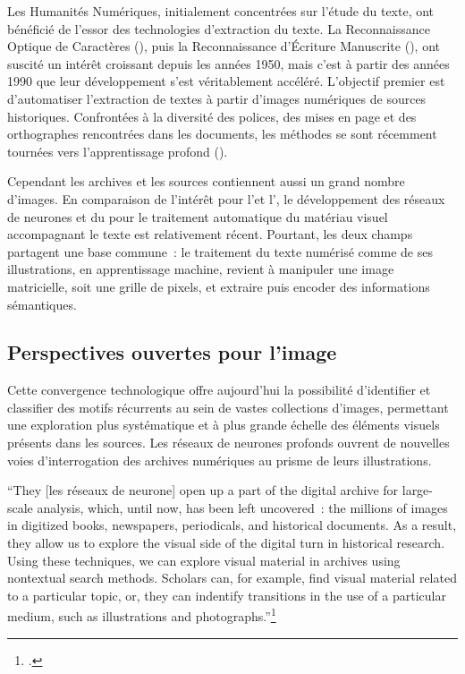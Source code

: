 Les Humanités Numériques, initialement concentrées sur l'étude du texte, ont bénéficié de l'essor des technologies d'extraction du texte. La Reconnaissance Optique de Caractères (\ocr), puis la Reconnaissance d'Écriture Manuscrite (\htr), ont suscité un intérêt croissant depuis les années 1950, mais c'est à partir des années 1990 que leur développement s'est véritablement accéléré. L'objectif premier est d'automatiser l'extraction de textes à partir d'images numériques de sources historiques. Confrontées à la diversité des polices, des mises en page et des orthographes rencontrées dans les documents, les méthodes se sont récemment tournées vers l'apprentissage profond (\dl). 

Cependant les archives et les sources contiennent aussi un grand nombre d'images. En comparaison de l'intérêt pour l'\htr et l'\ocr, le développement des réseaux de neurones et du \ml pour le traitement automatique du matériau visuel accompagnant le texte est relativement récent. Pourtant, les deux champs partagent une base commune~: le traitement du texte numérisé comme de ses illustrations, en apprentissage machine, revient à manipuler une image matricielle, soit une grille de pixels, et extraire puis encoder des informations sémantiques. 

\subsection{Perspectives ouvertes pour l'image}

Cette convergence technologique offre aujourd'hui la possibilité d'identifier et classifier des motifs récurrents au sein de vastes collections d'images, permettant une exploration plus systématique et à plus grande échelle des éléments visuels présents dans les sources. Les réseaux de neurones profonds ouvrent de nouvelles voies d'interrogation des archives numériques au prisme de leurs illustrations. 

\begin{kwote}
``They [les réseaux de neurone] open up a part of the digital archive for large-scale analysis, which, until now, has been left uncovered~: the millions of images in digitized books, newspapers, periodicals, and historical documents. As a result, they allow us to explore the visual side of the digital turn in historical research. Using these techniques, we can explore visual material in archives using nontextual search methods. Scholars can, for example, find visual material related to a particular topic, or, they can indentify transitions in the use of a particular medium, such as illustrations and photographs.''\footcite[p.2]{wevers_visual_2020}
\end{kwote}

